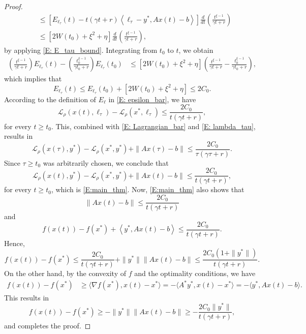 \documentclass[pdflatex,sn-mathphys-num]{sn-jnl}
\theoremstyle{thmstyleone}
\theoremstyle{thmstyletwo}
\theoremstyle{thmstylethree}
\begin{document}
\begin{proof}
\begin{align*}
&\le \left[E_{\ell_\tau}(t)-t(\gamma t+r) \left\langle \ell_\tau - y^*, Ax(t)-b \right\rangle\right]\frac{d}{dt}\left(\tfrac{t^{\xi-1}}{\gamma t+r}\right) \\
&\le \left[2W(t_0) + \xi^2 + \eta \right] \frac{d}{dt}\left(\tfrac{t^{\xi-1}}{\gamma t+r}\right),
\end{align*}
by applying \eqref{E: E_tau_bound}. Integrating from $t_0$ to $t$, we obtain
\begin{align*}
\left(\tfrac{t^{\xi-1}}{\gamma t+r}\right)E_{\ell_\tau}(t)-\left(\tfrac{t_0^{\xi-1}}{\gamma t_0+r}\right)E_{\ell_\tau}(t_0) 
&\le  \left[2W(t_0) + \xi^2 + \eta \right] \left(\tfrac{t^{\xi-1}}{\gamma t+r}-\tfrac{t_0^{\xi-1}}{\gamma t_0+r}\right),
\end{align*}
which implies that
$$E_{\ell_\tau}(t) \le E_{\ell_\tau}(t_0) + \left[2W(t_0) + \xi^2 + \eta \right] \le 2C_0.$$
According to the definition of $E_{\ell}$ in \eqref{E: epsilon_bar}, we have
$$ \mathcal{L}_\rho\left(x(t),\ell_\tau\right) - \mathcal{L}_\rho(x^*,\ell_\tau) \le \frac{2C_0}{t(\gamma t + r)},$$
for every $t\ge t_0$. This, combined with \eqref{E: Lagrangian_bar} and \eqref{E: lambda_tau}, results in
$$ \mathcal{L}_\rho\left(x(\tau),y^*\right) - \mathcal{L}_\rho(x^*,y^*) + \| Ax(\tau)-b \|
\le \frac{2C_0}{\tau(\gamma \tau + r)}. $$
Since $\tau\ge t_0$ was arbitrarily chosen, we conclude that
$$ \mathcal{L}_\rho\left(x(t),y^*\right) - \mathcal{L}_\rho(x^*,y^*) + \| Ax(t)-b \| 
\le \frac{2C_0}{t(\gamma t + r)}, $$
for every $t\ge t_0$, which is \eqref{E:main_thm}. Now, \eqref{E:main_thm} also shows that
$$ \| Ax(t)-b \| \le \frac{2C_0}{t(\gamma t + r)}$$
and
$$f\left( x(t) \right) - f(x^*) + \left\langle y^*, Ax(t) - b \right\rangle 
\le \frac{2C_0}{t(\gamma t + r)}.$$
Hence,
$$ f\left( x(t) \right) - f(x^*)  
\le \frac{2C_0}{t(\gamma t + r)} + \|y^* \| \left\| Ax(t) - b \right\| 
\le \frac{2C_0 \left(1+\|y^* \|\right)}{t(\gamma t + r)}. $$
On the other hand, by the convexity of $f$ and the optimality conditions, we have
\begin{align*}
f\left( x(t) \right) - f(x^*) 
&\ge \langle \nabla f(x^*), x(t) - x^* \rangle 
= - \langle A^* y^*, x(t) - x^* \rangle 
= - \langle y^*, Ax(t) - b \rangle.
\end{align*}
This results in
$$ f\left( x(t) \right) - f(x^*) 
\ge - \| y^* \|  \left\| Ax(t) - b \right\| 
\ge -\frac{2C_0 \| y^* \| }{t(\gamma t + r)},
$$
and completes the proof.
\end{proof}
\end{document}
